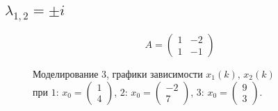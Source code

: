 \documentclass[a5paper, 10pt]{article}
\theoremstyle{definition}
\theoremstyle{plain}
\theoremstyle{remark}
\begin{document}
\subsection{$\lambda_{1, 2} = \pm i$}
\begin{equation}
A =
\begin{pmatrix}
1 & -2 \\
1 & -1
\end{pmatrix}
\end{equation}
\begin{figure}[h!]
\caption{Моделирование 3, графики зависимости $x_1 \left( k \right), \, x_2 \left( k \right)$ \\ при  $1: \, x_0 = \begin{pmatrix} 1 \\ 4 \end{pmatrix}$, $2: \, x_0 = \begin{pmatrix} -2 \\ 7 \end{pmatrix}$, $3: \, x_0 = \begin{pmatrix} 9 \\ 3 \end{pmatrix}$.}
\end{figure}


\end{document}
